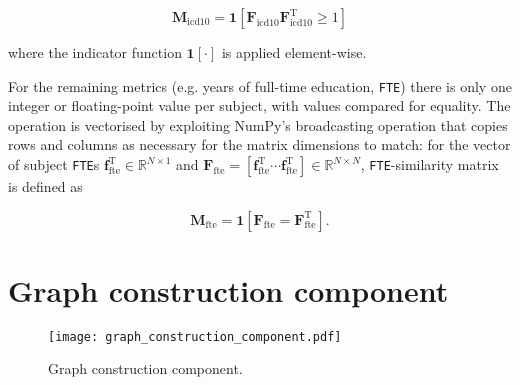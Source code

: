 \begin{equation}
    \mathbf{M}_{\text{icd10}} = \mathbf{1}\left[\mathbf{F}_{\text{icd10}}^{\ }\mathbf{F}_{\text{icd10}}^{\mathrm{T}} \geq 1\right]
\end{equation}

where the indicator function $\mathbf{1}[\cdot]$ is applied element-wise.

For the remaining metrics (e.g. years of full-time education, \texttt{FTE}) there is only one integer or floating-point value per subject, with values  compared for equality. The operation is vectorised by exploiting NumPy's broadcasting operation that copies rows and columns as necessary for the matrix dimensions to match: for the vector of subject \texttt{FTE}s $\mathbf{f}_{\text{fte}}^{\mathrm{T}} \in \mathbb{R}^{N \times 1}$ and $\mathbf{F}_{\text{fte}} = [\mathbf{f}_{\text{fte}}^{\mathrm{T}} \cdots \mathbf{f}_{\text{fte}}^{\mathrm{T}}] \in \mathbb{R}^{N \times N}$, \texttt{FTE}-similarity matrix is defined as

\begin{equation}
    \mathbf{M}_{\text{fte}} = \mathbf{1}\left[\mathbf{F}_{\text{fte}}^{\ } = \mathbf{F}_{\text{fte}}^{\mathrm{T}} \right].
\end{equation}




\section{Graph construction component}

\begin{figure}[h]
    \texttt{[image: graph\_construction\_component.pdf]}
    \caption{Graph construction component.}\label{graph-construction-component}
\end{figure}

